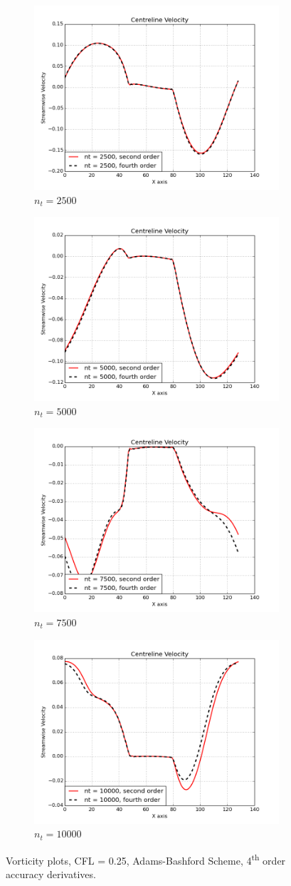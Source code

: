 \documentclass[10pt, a4paper]{article}
\begin{document}
\begin{figure}[htb!]
\centering
\begin{subfigure}{.5\textwidth}
  \centering
  \includegraphics[width=.5\linewidth, clip=true, trim=1cm 2cm 1cm 1cm]{velocity1}
  \caption{$n_t = 2500$}
\end{subfigure}%
\begin{subfigure}{.5\textwidth}
  \centering
  \includegraphics[width=.5\linewidth, clip=true, trim=1cm 2cm 1cm 1cm]{velocity2}
  \caption{$n_t = 5000$}
\end{subfigure}
\newline
\begin{subfigure}{.5\textwidth}
  \centering
  \includegraphics[width=.5\linewidth, clip=true, trim=1cm 2cm 1cm 1cm]{velocity3}
  \caption{$n_t = 7500$}
\end{subfigure}%
\begin{subfigure}{.5\textwidth}
  \centering
  \includegraphics[width=.5\linewidth, clip=true, trim=1cm 2cm 1cm 1cm]{velocity4}
  \caption{$n_t = 10000$}
\end{subfigure}
\caption{Vorticity plots, CFL = 0.25, Adams-Bashford Scheme, 4\textsuperscript{th} order accuracy derivatives.}
\label{fig:q5}
\end{figure}
\end{document}
